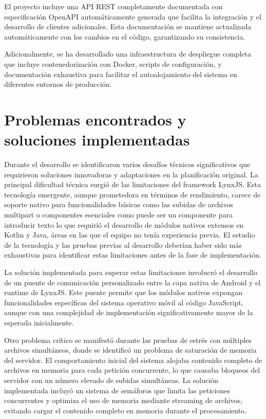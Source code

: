 El proyecto incluye una API REST completamente documentada con especificación OpenAPI automáticamente generada que facilita la integración y el desarrollo de clientes adicionales. Esta documentación se mantiene actualizada automáticamente con los cambios en el código, garantizando su consistencia.

Adicionalmente, se ha desarrollado una infraestructura de despliegue completa que incluye contenedorización con Docker, scripts de configuración, y documentación exhaustiva para facilitar el autoalojamiento del sistema en diferentes entornos de producción.

\section{Problemas encontrados y soluciones implementadas}

Durante el desarrollo se identificaron varios desafíos técnicos significativos que requirieron soluciones innovadoras y adaptaciones en la planificación original. La principal dificultad técnica surgió de las limitaciones del framework LynxJS. Esta tecnología emergente, aunque prometedora en términos de rendimiento, carece de soporte nativo para funcionalidades básicas como las subidas de archivos multipart o componentes esenciales como puede ser un componente para introducir texto lo que requirió el desarrollo de módulos nativos extensos en Kotlin y Java, áreas en las que el equipo no tenía experiencia previa. El estudio de la tecnología y las pruebas previas al desarrollo deberían haber sido más exhaustivas para identificar estas limitaciones antes de la fase de implementación.

La solución implementada para superar estas limitaciones involucró el desarrollo de un puente de comunicación personalizado entre la capa nativa de Android y el runtime de LynxJS. Este puente permite que los módulos nativos expongan funcionalidades específicas del sistema operativo móvil al código JavaScript, aunque con una complejidad de implementación significativamente mayor de la esperada inicialmente.

Otro problema crítico se manifestó durante las pruebas de estrés con múltiples archivos simultáneos, donde se identificó un problema de saturación de memoria del servidor. El comportamiento inicial del sistema alojaba contenido completo de archivos en memoria para cada petición concurrente, lo que causaba bloqueos del servidor con un número elevado de subidas simultáneas. La solución implementada incluyó un sistema de semáforos que limita las peticiones concurrentes y optimiza el uso de memoria mediante streaming de archivos, evitando cargar el contenido completo en memoria durante el procesamiento.

